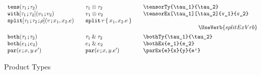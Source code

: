 \documentclass[11pt]{article}
\begin{document}
\begin{figure}
\begin{small}
\begin{displaymath}
\begin{array}{l@{\qquad}l@{\qquad}l@{\qquad}l}
        \tensorTy{\tau_1}{\tau_2}                      & \tensorTy*{\tau_1}{\tau_2} & \verb|\tensorTy{\tau_1}{\tau_2}|                      \\
        \tensorEx[\tau_1][\tau_2]{v_1}{v_2}            & \tensorEx*{v_1}{v_2}       & \verb|\tensorEx[\tau_1][\tau_2]{v_1}{v_2}|                            \\
        \splitEx[\tau_1][\tau_2][\rho]{v}{x_1}{x_2}{e} & \splitEx*{v}{x_1}{x_2}{e}  & \\
        \multicolumn{3}{r}{\UseVerb{splitExVrb}} \\[1ex]
        \bothTy{\tau_1}{\tau_2}                        & \bothTy*{\tau_1}{\tau_2}   & \verb|\bothTy{\tau_1}{\tau_2}|                        \\
        \bothEx{e_1}{e_2}                              & \bothEx*{e_1}{e_2}         & \verb|\bothEx{e_1}{e_2}|                              \\
        \parEx{e}{x}{y}{e'}                            & \parEx*{e}{x}{y}{e'}       & \verb|\parEx{e}{x}{y}{e'}| 
      \end{array}
    \end{displaymath}
  \end{small} 

  \caption{Product Types}
  \label{fig:prod}
\end{figure}
\end{document}
